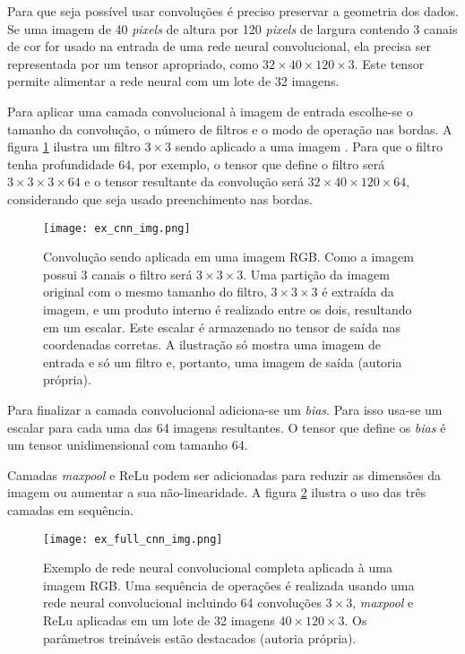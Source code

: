 Para que seja possível usar convoluções é preciso preservar a
geometria dos dados. Se uma imagem de 40
\emph{pixels} de altura por 120 \emph{pixels} de largura contendo 3 canais de
cor for usado na
entrada de uma rede neural convolucional, ela precisa ser representada por um
tensor apropriado, como $32 \times 40 \times 120 \times 3$. Este tensor
permite alimentar a rede neural com um lote de 32 imagens.

Para aplicar uma camada convolucional à imagem de entrada escolhe-se o tamanho
da convolução, o número de filtros e o modo de operação nas bordas. A figura
\ref{fig:ex_cnn_img} ilustra um filtro $3 \times 3$ sendo aplicado a uma imagem
.
Para que o filtro tenha profundidade 64, por exemplo, o tensor que define o
filtro será $3 \times 3 \times 3 \times 64$ e o tensor resultante da
convolução será $32 \times 40 \times 120 \times 64$,
considerando que seja usado preenchimento nas bordas.

\begin{figure}[!htb]
	\centering
	\texttt{[image: ex\_cnn\_img.png]}
	\caption[Convolução sendo aplicada em uma imagem RGB]{
		Convolução sendo aplicada em uma imagem RGB.
		Como a imagem possui 3 canais o filtro será $3 \times 3 \times 3$.
		Uma partição da imagem original com o mesmo tamanho do filtro,
		$3 \times 3 \times 3$ é extraída da imagem, e um
		produto interno é realizado entre os dois, resultando em um escalar. Este
		escalar é armazenado no tensor de saída nas coordenadas corretas. A
		ilustração só mostra uma imagem de entrada e só um filtro e, portanto, uma
		imagem de saída (autoria própria).}
	\label{fig:ex_cnn_img}
\end{figure}

Para finalizar a camada convolucional adiciona-se um \emph{bias}. Para
isso usa-se um escalar para cada uma das 64 imagens resultantes. O
tensor que define os \emph{bias} é um tensor unidimensional com tamanho 64.

Camadas \emph{maxpool} e ReLu podem ser adicionadas para reduzir as
dimensões da imagem ou aumentar a sua não-linearidade. A figura
\ref{fig:ex_full_cnn_img} ilustra o uso das três camadas em sequência.

\begin{figure}[!htb]
	\centering
	\texttt{[image: ex\_full\_cnn\_img.png]}
	\caption[Exemplo de rede neural convolucional completa aplicada à uma imagem
		RGB]{
		Exemplo de rede neural convolucional completa aplicada à uma imagem
		RGB.
		Uma sequência de operações é realizada usando uma rede neural
		convolucional incluindo 64 convoluções $3 \times 3$, \emph{maxpool} e
		ReLu aplicadas em um
		lote de 32 imagens $40 \times 120 \times 3$. Os parâmetros treináveis
		estão destacados (autoria própria).}
	\label{fig:ex_full_cnn_img}
\end{figure}

